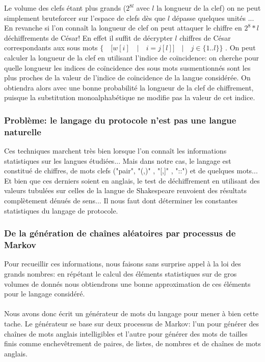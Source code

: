 \documentclass[11pt]{article} %
\begin{document}
    Le volume des clefs étant plus grands ($2^{8l}$ avec $l$ la longueur de la clef) on ne peut simplement bruteforcer sur l'espace de clefs dès que $l$ dépasse quelques unités ... En revanche si l'on connaît la longueur de clef on peut attaquer le chiffre en $2^8*l$ déchiffrements de César! En effet il suffit de décrypter $l$ chiffres de César correspondants aux sous mots 
$\{\quad [ w[i]\quad | \quad i = j [l] ] \quad | \quad j \in \{1..l\} \}$ . On peut calculer la longueur de la clef en utilisant l'indice de coïncidence: on cherche pour quelle longueur les indices de coïncidence des sous mots susmentionnés sont les plus proches de la valeur de l'indice de coïncidence de la langue considérée. On obtiendra alors avec une bonne probabilité la longueur de la clef de chiffrement, puisque la substitution monoalphabétique ne modifie pas la valeur de cet indice.

\subsubsection{Problème: le langage du protocole n'est pas une langue naturelle}

    Ces techniques marchent très bien lorsque l'on connaît les informations statistiques sur les langues étudiées... Mais dans notre cas, le langage est constitué de chiffres, de mots clefs ("pair", "(,)" , "[,]" , "::") et de quelques mots... Et bien que ces derniers soient en anglais, le test de déchiffrement en utilisant des valeurs tubulées sur celles de la langue de Shakespeare renvoient des résultats complètement dénués de sens... Il nous faut dont déterminer les constantes statistiques du langage de protocole.

\subsubsection{De la génération de chaînes aléatoires par processus de Markov}

    Pour recueillir ces informations, nous faisons sans surprise appel à la loi des grands nombres: en répétant le calcul des éléments statistiques sur de gros volumes de donnés nous obtiendrons une bonne approximation de ces éléments pour le langage considéré. \\\\

     Nous avons donc écrit un générateur de mots du langage pour mener à bien cette tache. Le générateur se base sur deux processus de Markov: l'un pour générer des chaînes de mots anglais intelligibles et l'autre pour générer des mots de tailles finis comme enchevêtrement de paires, de listes, de nombres et de chaînes de mots anglais. \\\\
\end{document}
